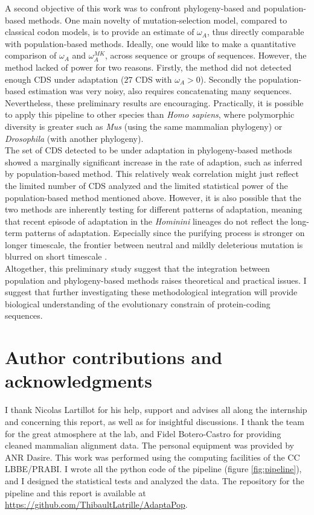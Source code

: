 \documentclass[10pt]{article}
\begin{document}
\begin{multicols}{2}
	A second objective of this work was to confront phylogeny-based and population-based methods. One main novelty of mutation-selection model, compared to classical codon models, is to provide an estimate of $\omega_A$, thus directly comparable with population-based methods. Ideally, one would like to make a quantitative comparison of $\omega_A$ and $\omega_A^{MK}$, across sequence or groups of sequences. However, the method lacked of power for two reasons. Firstly, the method did not detected enough CDS under adaptation ($27$ CDS with $\omega_A > 0$). Secondly the population-based estimation was very noisy, also requires concatenating many sequences. Nevertheless, these preliminary results are encouraging. Practically, it is possible to apply this pipeline to other species than \textit{Homo sapiens}, where polymorphic diversity is greater such as \textit{Mus} (using the same mammalian phylogeny) or \textit{Drosophila} (with another phylogeny). \\
	
	The set of CDS detected to be under adaptation in phylogeny-based methods showed a marginally significant increase in the rate of adaption, such as inferred by population-based method. This relatively weak correlation might just reflect the limited number of CDS analyzed and the limited statistical power of the population-based method mentioned above. However, it is also possible that the two methods are inherently testing for different patterns of adaptation, meaning that recent episode of adaptation in the \textit{Hominini} lineages do not reflect the long-term patterns of adaptation. Especially since the purifying process is stronger on longer timescale, the frontier between neutral and mildly deleterious mutation is blurred on short timescale \cite{ho_time_2005}. \\
	
	Altogether, this preliminary study suggest that the integration between population and phylogeny-based methods raises theoretical and practical issues. I suggest that further investigating these methodological integration will provide biological understanding of the evolutionary constrain of protein-coding sequences. \\
	
	\section*{Author contributions and acknowledgments}
	I thank Nicolas Lartillot for his help, support and advises all along the internship and concerning this report, as well as for insightful discussions. I thank the team for the great atmosphere at the lab, and Fidel Botero-Castro for providing cleaned mammalian alignment data. The personal equipment was provided by ANR Dasire. This work was performed using the computing  facilities of the CC LBBE/PRABI. I wrote all the python code of the pipeline (figure \ref{fig:pipeline}), and I designed the statistical tests and analyzed the data. The repository for the pipeline and this report is available at \href{https://github.com/ThibaultLatrille/AdaptaPop}{https://github.com/ThibaultLatrille/AdaptaPop}.

	
	
	
	\end{multicols}
\end{document}
